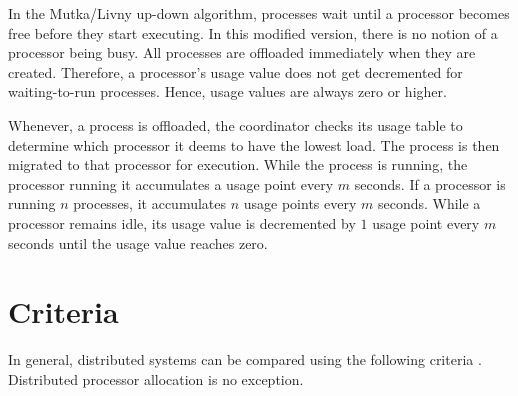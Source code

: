 \documentclass{report}
\begin{document}
In the Mutka/Livny up-down algorithm, processes wait until a processor
becomes free before they start executing.  In this modified version, there
is no notion of a processor being busy.  All processes are offloaded
immediately when they are created.  Therefore, a processor's usage value
does not get decremented for waiting-to-run processes.  Hence, usage values
are always zero or higher.

Whenever, a process is offloaded, the coordinator checks its usage table to
determine which processor it deems to have the lowest load.  The process is
then migrated to that processor for execution.  While the process is
running, the processor running it accumulates a usage point every $m$
seconds.  If a processor is running $n$ processes, it accumulates $n$ usage
points every $m$ seconds.  While a processor remains idle, its usage value
is decremented by $1$ usage point every $m$ seconds until the usage value
reaches zero.


\section{Criteria}
\label{sec:criteria}

In general, distributed systems can be compared using the following
criteria \cite{Tanenbaum}.  Distributed processor allocation is no
exception.
\end{document}
